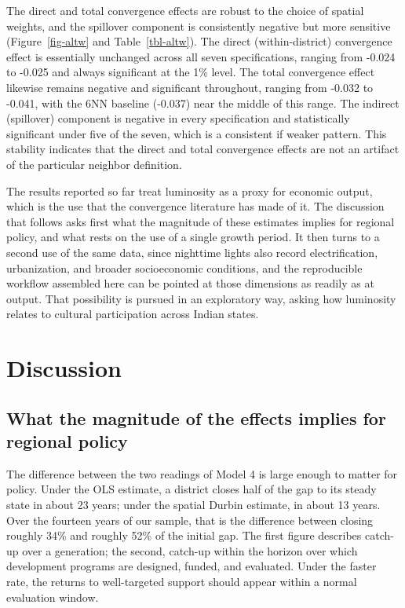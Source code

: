 \documentclass[
  letterpaper,
  DIV=11,
  numbers=noendperiod]{scrartcl}
\begin{document}
\endgroup

The direct and total convergence effects are robust to the choice of
spatial weights, and the spillover component is consistently negative
but more sensitive (Figure~\ref{fig-altw} and Table~\ref{tbl-altw}). The
direct (within-district) convergence effect is essentially unchanged
across all seven specifications, ranging from -0.024 to -0.025 and
always significant at the 1\% level. The total convergence effect
likewise remains negative and significant throughout, ranging from
-0.032 to -0.041, with the 6NN baseline (-0.037) near the middle of this
range. The indirect (spillover) component is negative in every
specification and statistically significant under five of the seven,
which is a consistent if weaker pattern. This stability indicates that
the direct and total convergence effects are not an artifact of the
particular neighbor definition.

The results reported so far treat luminosity as a proxy for economic
output, which is the use that the convergence literature has made of it.
The discussion that follows asks first what the magnitude of these
estimates implies for regional policy, and what rests on the use of a
single growth period. It then turns to a second use of the same data,
since nighttime lights also record electrification, urbanization, and
broader socioeconomic conditions, and the reproducible workflow
assembled here can be pointed at those dimensions as readily as at
output. That possibility is pursued in an exploratory way, asking how
luminosity relates to cultural participation across Indian states.

\section{Discussion}\label{discussion}

\subsection{What the magnitude of the effects implies for regional
policy}\label{what-the-magnitude-of-the-effects-implies-for-regional-policy}

The difference between the two readings of Model 4 is large enough to
matter for policy. Under the OLS estimate, a district closes half of the
gap to its steady state in about 23 years; under the spatial Durbin
estimate, in about 13 years. Over the fourteen years of our sample, that
is the difference between closing roughly 34\% and roughly 52\% of the
initial gap. The first figure describes catch-up over a generation; the
second, catch-up within the horizon over which development programs are
designed, funded, and evaluated. Under the faster rate, the returns to
well-targeted support should appear within a normal evaluation window.
\end{document}
